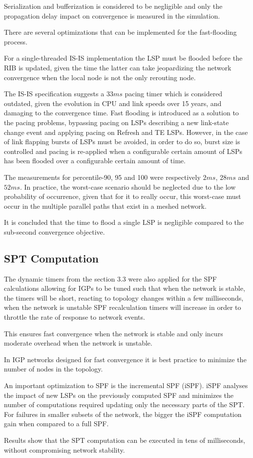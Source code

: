 \documentclass[a4paper, 11pt, UTF8]{article}
\begin{document}
Serialization and bufferization is considered to be negligible and only the propagation delay impact on convergence is measured in the simulation.

There are several optimizations that can be implemented for the fast-flooding process.

For a single-threaded IS-IS implementation the LSP must be flooded before the RIB is updated, given the time the latter can take jeopardizing the network convergence when the local node is not the only rerouting node.

The IS-IS specification suggests a $33ms$ pacing timer which is considered outdated, given the evolution in CPU and link speeds over 15 years, and damaging to the convergence time.
Fast flooding is introduced as a solution to the pacing problems, bypassing pacing on LSPs describing a new link-state change event and applying pacing on Refresh and TE LSPs. 
However, in the case of link flapping bursts of LSPs must be avoided, in order to do so,
burst size is controlled and pacing is re-applied when a configurable certain amount of LSPs has been flooded over a configurable certain amount of time.

The measurements for percentile-90, 95 and 100 were respectively $2ms$, $28ms$ and $52ms$.
In practice, the worst-case scenario should be neglected due to the low probability of occurrence,
given that for it to really occur, this worst-case must occur in the multiple parallel paths that exist in a meshed network.

It is concluded that the time to flood a single LSP is negligible compared to the sub-second convergence objective.

\subsection{SPT Computation}
The dynamic timers from the section 3.3 were also applied for the SPF calculations allowing for IGPs to be tuned such that when the network is stable, 
the timers will be short, reacting to topology changes within a few milliseconds, 
when the network is unstable SPF recalculation timers will increase in order to throttle the rate of response to network events.

This ensures fast convergence when the network is stable and only incurs moderate overhead when the network is unstable.

In IGP networks designed for fast convergence it is best practice to minimize the number of nodes in the topology.

An important optimization to SPF is the incremental SPF (iSPF).
iSPF analyses the impact of new LSPs on the previously computed SPF and minimizes the number of computations required updating only the necessary parts of the SPT.
For failures in smaller subsets of the network, the bigger the iSPF computation gain when compared to a full SPF.

Results show that the SPT computation can be executed in tens of milliseconds, without compromising network stability.



% 
% 
\end{document}
